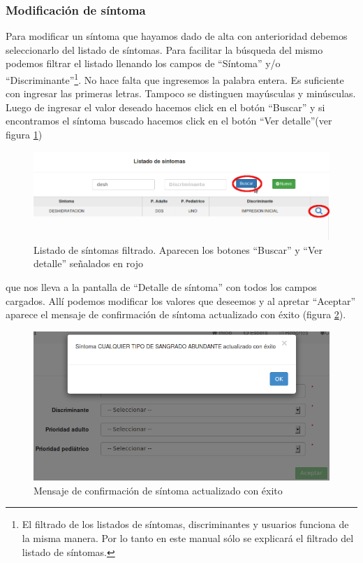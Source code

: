 \subsubsection{Modificación de síntoma}
Para modificar un síntoma que hayamos dado de alta con anterioridad debemos seleccionarlo del listado de síntomas. Para facilitar la búsqueda del mismo podemos filtrar el listado llenando los campos de ``Síntoma'' y/o ``Discriminante''\footnote{El filtrado de los listados de síntomas, discriminantes y usuarios funciona de la misma manera. Por lo tanto en este manual sólo se explicará el filtrado del listado de síntomas.}. No hace falta que ingresemos la palabra entera. Es suficiente con ingresar las primeras letras. Tampoco se distinguen mayúsculas y minúsculas. Luego de ingresar el valor deseado hacemos click en el botón ``Buscar'' y si encontramos el síntoma buscado hacemos click en el botón ``Ver detalle''(ver figura \ref{fig:sintomas_filtro}) 
\begin{figure}
\centerline{\includegraphics[width=1\textwidth]{sintomas_listado_buscar.png}}
\caption{Listado de síntomas filtrado. Aparecen los botones ``Buscar'' y ``Ver detalle'' señalados en rojo}
\label{fig:sintomas_filtro}
\end{figure}
que nos lleva a la pantalla de ``Detalle de síntoma'' con todos los campos cargados. Allí podemos modificar los valores que deseemos y al apretar ``Aceptar'' aparece el mensaje de confirmación de síntoma actualizado con éxito (figura \ref{fig:sintoma_actualizado_con_exito}).
\begin{figure}
\centerline{\includegraphics[width=1\textwidth]{sintoma_actualizado_con_exito.png}}
\caption{Mensaje de confirmación de síntoma actualizado con éxito}
\label{fig:sintoma_actualizado_con_exito}
\end{figure}

